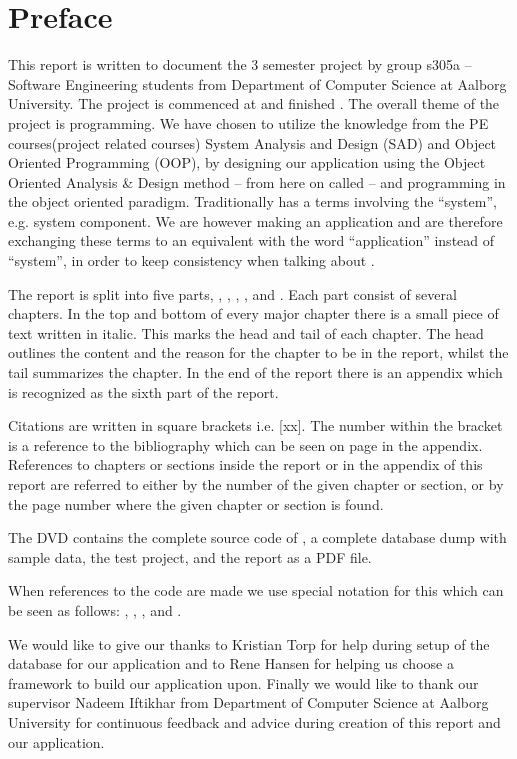 \chapter*{Preface}
\label{chap:preface}
%
\emptyTop{}%
\vspace{-15mm}%
This report is written to document the 3\rd{} semester project by group s305a -- Software Engineering students from Department of Computer Science at Aalborg University. 
The project is commenced at  and finished .
The overall theme of the project is programming. 
We have chosen to utilize the knowledge from the PE courses(project related courses) System Analysis and Design (SAD) and Object Oriented Programming (OOP), by designing our application using the Object Oriented Analysis \& Design method -- from here on called \ooad[] -- and programming \hdesk[] in the object oriented paradigm.  
Traditionally \ooad[] has a terms involving the ``system'', e.g. system component.
We are however making an application and are therefore exchanging these terms to an equivalent with the word ``application'' instead of ``system'', in order to keep consistency when talking about \hdesk[].

The report is split into five parts, , , , , and .
Each part consist of several chapters.
In the top and bottom of every major chapter there is a small piece of text written in italic.
This marks the head and tail of each chapter.
The head outlines the content and the reason for the chapter to be in the report, whilst the tail summarizes the chapter.
In the end of the report there is an appendix which is recognized as the sixth part of the report.

Citations are written in square brackets i.e. [xx]. The number within the bracket is a reference to the bibliography which can be seen on page \pageref{chap:bib} in the appendix.
References to chapters or sections inside the report or in the appendix of this report are referred to either by the number of the given chapter or section, or by the page number where the given chapter or section is found.

The DVD contains the complete source code of \hdesk[], a complete database dump with sample data, the test project, and the report as a PDF file.  

When references to the code are made we use special notation for this which can be seen as follows: , , , and .

We would like to give our thanks to Kristian Torp for help during setup of the database for our application and to Rene Hansen for helping us choose a framework to build our application upon.
Finally we would like to thank our supervisor Nadeem Iftikhar from Department of Computer Science at Aalborg University for continuous feedback and advice during creation of this report and our application.